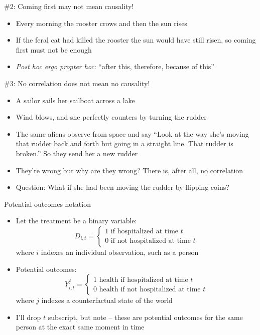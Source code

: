 \documentclass{beamer}
\begin{document}
\begin{frame}{\#2: Coming first may not mean causality!}

\begin{itemize}
\item Every morning the rooster crows and then the sun rises
\item If the feral cat had killed the rooster the sun would have still risen, so coming first must not be enough
\item \emph{Post hoc ergo propter hoc}: ``after this, therefore, because of this''
\end{itemize}

\end{frame}




\begin{frame}{\#3: No correlation does not mean no causality!}

\begin{itemize}
	\item A sailor sails her sailboat across a lake
	\item Wind blows, and she perfectly counters by turning the rudder
	\item The same aliens observe from space and say ``Look at the way she's moving that rudder back and forth but going in a straight line.  That rudder is broken.'' So they send her a new rudder
	\item They're wrong but why are they wrong? There is, after all, no correlation
	\item Question: What if she had been moving the rudder by flipping coins?
\end{itemize}

\end{frame}



\begin{frame}{Potential outcomes notation}
	
	\begin{itemize}
	\item Let the treatment be a binary variable: $$D_{i,t} =\begin{cases} 1 \text{ if hospitalized at time $t$} \\ 0 \text{ if not hospitalized at time $t$} \end{cases}$$where $i$ indexes an individual observation, such as a person

	\item Potential outcomes: $$Y_{i,t}^j =\begin{cases} 1 \text{ health if hospitalized at time $t$} \\ 0 \text{ health if not hospitalized at time $t$} \end{cases}$$where $j$ indexes a counterfactual state of the world

	\item I'll drop $t$ subscript, but note -- these are potential outcomes for the same person at the exact same moment in time
	\end{itemize}
\end{frame}
\end{document}

